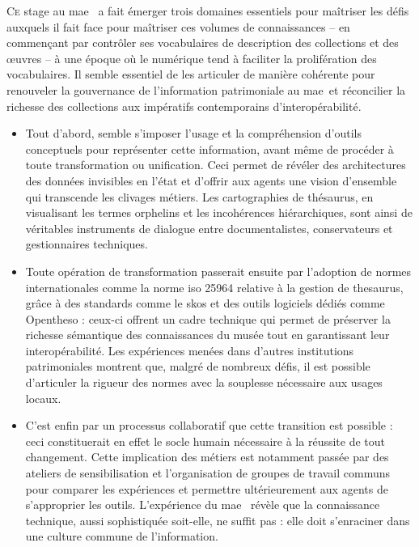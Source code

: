 \documentclass[12pt,twoside]{book}
\newcommand{\mae}{\ac{mae}} %
\newcommand{\maelong}{\acf{mae}} %
\begin{document}
	\lettrine{C}{e} stage au \maelong~ a fait émerger trois domaines essentiels pour maîtriser les défis auxquels il fait face pour maîtriser ces volumes de connaissances -- en commençant par contrôler ses vocabulaires de description des collections et des œuvres -- à une époque où le numérique tend à faciliter la prolifération des vocabulaires. Il semble essentiel de les articuler de manière cohérente pour renouveler la gouvernance de l'information patrimoniale au \mae~et réconcilier la richesse des collections aux impératifs contemporains d'interopérabilité.
	
	\begin{itemize} 
		
		\item Tout d'abord, semble s'imposer l'usage et la compréhension d'outils conceptuels pour représenter cette information, avant même de procéder à toute transformation ou unification. Ceci permet de révéler des architectures des données invisibles en l'état et d'offrir aux agents une vision d'ensemble qui transcende les clivages métiers. Les cartographies de thésaurus, en visualisant les termes orphelins et les incohérences hiérarchiques, sont ainsi de véritables instruments de dialogue entre documentalistes, conservateurs et gestionnaires techniques.
		
		
		\item Toute opération de transformation passerait ensuite par l'adoption de normes internationales comme la norme \gls{iso} 25964 relative à la gestion de \gls{thesaurus}, grâce à des standards comme le \gls{skos} et des outils logiciels dédiés comme Opentheso : ceux-ci offrent un cadre technique qui permet de préserver la richesse sémantique des connaissances du musée tout en garantissant leur interopérabilité. Les expériences menées dans d'autres institutions patrimoniales montrent que, malgré de nombreux défis, il est possible d'articuler la rigueur des normes avec la souplesse nécessaire aux usages locaux.
		
		
		\item C'est enfin par un processus collaboratif que cette transition est possible : ceci constituerait en effet le socle humain nécessaire à la réussite de tout changement. Cette implication des métiers est notamment passée par des ateliers de sensibilisation et l'organisation de groupes de travail communs pour comparer les expériences et permettre ultérieurement aux agents de s'approprier les outils. L'expérience du \mae~ révèle que la connaissance technique, aussi sophistiquée soit-elle, ne suffit pas : elle doit s'enraciner dans une culture commune de l'information.
		
	\end{itemize}
	
\end{document}
